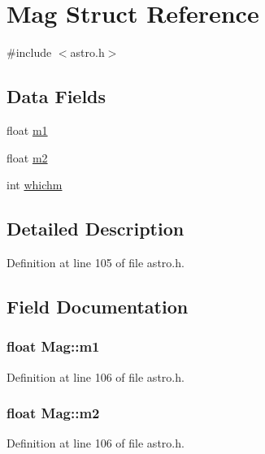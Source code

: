 \hypertarget{struct_mag}{\section{Mag Struct Reference}
\label{struct_mag}
}


{\ttfamily \#include $<$astro.\-h$>$}

\subsection*{Data Fields}
\begin{DoxyCompactItemize}
\item 
float \hyperlink{struct_mag_ab82208f920dd8642ecf78218c585b089}{m1}
\item 
float \hyperlink{struct_mag_afffaacda7c721864254e456b0e9cf7be}{m2}
\item 
int \hyperlink{struct_mag_a6bd80ae4be8970271bf1e1d3b6096845}{whichm}
\end{DoxyCompactItemize}


\subsection{Detailed Description}


Definition at line 105 of file astro.\-h.



\subsection{Field Documentation}
\hypertarget{struct_mag_ab82208f920dd8642ecf78218c585b089}{
\subsubsection[{m1}]{\setlength{\rightskip}{0pt plus 5cm}float Mag\-::m1}}\label{struct_mag_ab82208f920dd8642ecf78218c585b089}


Definition at line 106 of file astro.\-h.

\hypertarget{struct_mag_afffaacda7c721864254e456b0e9cf7be}{
\subsubsection[{m2}]{\setlength{\rightskip}{0pt plus 5cm}float Mag\-::m2}}\label{struct_mag_afffaacda7c721864254e456b0e9cf7be}


Definition at line 106 of file astro.\-h.

